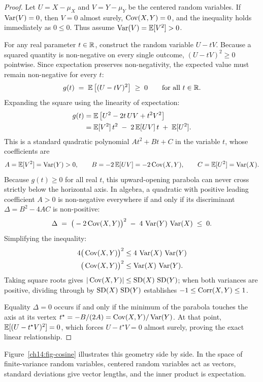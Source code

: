 \begin{proof}
Let $U = X - \mu_X$ and $V = Y - \mu_Y$ be the centered random variables. If $\operatorname{Var}(V) = 0$, then $V = 0$ almost surely, $\operatorname{Cov}(X,Y) = 0$, and the inequality holds immediately as $0 \le 0$. Thus assume $\operatorname{Var}(V) = \operatorname{\mathbb{E}}[V^2] > 0$.

For any real parameter $t \in \mathbb{R}$, construct the random variable $U - tV$. Because a squared quantity is non-negative on every single outcome, $(U - tV)^2 \ge 0$ pointwise. Since expectation preserves non-negativity, the expected value must remain non-negative for every $t$:
\[
g(t) \;=\; \operatorname{\mathbb{E}}\big[(U - tV)^2\big] \;\ge\; 0 \qquad \text{for all } t \in \mathbb{R}.
\]
Expanding the square using the linearity of expectation:
\begin{align*}
g(t) &= \operatorname{\mathbb{E}}\big[U^2 - 2t\, UV + t^2 V^2\big] \\
     &= \operatorname{\mathbb{E}}[V^2]\, t^2 \;-\; 2\operatorname{\mathbb{E}}[UV]\, t \;+\; \operatorname{\mathbb{E}}[U^2].
\end{align*}
This is a standard quadratic polynomial $A t^2 + B t + C$ in the variable $t$, whose coefficients are
\[
A = \operatorname{\mathbb{E}}[V^2] = \operatorname{Var}(Y) > 0, \qquad B = -2\operatorname{\mathbb{E}}[UV] = -2\operatorname{Cov}(X,Y), \qquad C = \operatorname{\mathbb{E}}[U^2] = \operatorname{Var}(X).
\]
Because $g(t) \ge 0$ for all real $t$, this upward-opening parabola can never cross strictly below the horizontal axis. In algebra, a quadratic with positive leading coefficient $A > 0$ is non-negative everywhere if and only if its discriminant $\Delta = B^2 - 4AC$ is non-positive:
\[
\Delta \;=\; \big(-2\operatorname{Cov}(X,Y)\big)^2 \;-\; 4\,\operatorname{Var}(Y)\,\operatorname{Var}(X) \;\le\; 0.
\]
Simplifying the inequality:
\begin{align*}
4\big(\operatorname{Cov}(X,Y)\big)^2 &\le 4\,\operatorname{Var}(X)\,\operatorname{Var}(Y) \\
\big(\operatorname{Cov}(X,Y)\big)^2 &\le \operatorname{Var}(X)\,\operatorname{Var}(Y).
\end{align*}
Taking square roots gives $|\operatorname{Cov}(X,Y)| \le \operatorname{SD}(X)\,\operatorname{SD}(Y)$; when both variances are positive, dividing through by $\operatorname{SD}(X)\,\operatorname{SD}(Y)$ establishes $-1 \le \operatorname{Corr}(X,Y) \le 1$.

Equality $\Delta = 0$ occurs if and only if the minimum of the parabola touches the axis at its vertex $t^\star = -B/(2A) = \operatorname{Cov}(X,Y)/\operatorname{Var}(Y)$. At that point, $\operatorname{\mathbb{E}}[(U - t^\star V)^2] = 0$, which forces $U - t^\star V = 0$ almost surely, proving the exact linear relationship.
\end{proof}

Figure~\ref{ch14:fig-cosine} illustrates this geometry side by side. In the space of finite-variance random variables, centered random variables act as vectors, standard deviations give vector lengths, and the inner product is expectation.

